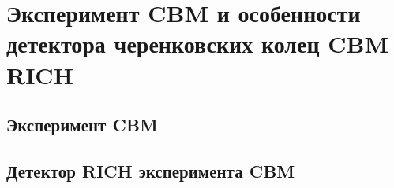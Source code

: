 \chapter{Эксперимент CBM и особенности детектора черенковских колец CBM RICH}\label{sec:secCbm}

\section{Эксперимент CBM}



\section{Детектор RICH эксперимента CBM}



